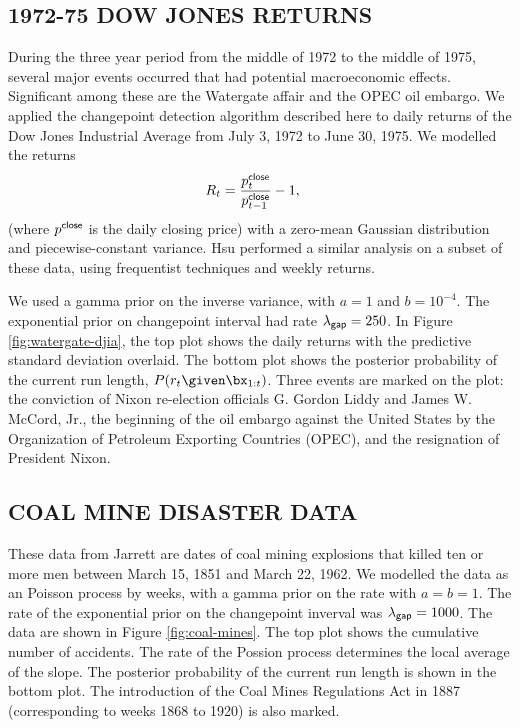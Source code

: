 \documentclass[]{article}
\begin{document}
    \subsection{1972-75 DOW JONES RETURNS}
      During the three year period from the middle of 1972 to the middle of
      1975, several major events occurred that had potential macroeconomic
      effects.  Significant among these are the Watergate affair and the
      OPEC oil embargo.  We applied the changepoint detection algorithm
      described here to daily returns of the Dow Jones Industrial Average
      from July 3, 1972 to June 30, 1975.  We modelled the returns
      \begin{align}
	R_{t} &= \frac{p^{\sf{close}}_{t}}{p^{\sf{close}}_{t-1}}-1,
      \end{align}
      (where $p^{\sf{close}}$ is the daily closing price) with a zero-mean
      Gaussian distribution and piecewise-constant variance.  Hsu
      \cite{hsu-1977a} performed a similar analysis on a subset of these
      data, using frequentist techniques and weekly returns.

      We used a gamma prior on the inverse variance, with $a=1$ and
      $b=10^{-4}$.  The exponential prior on changepoint interval had rate
      $\lambda_{\sf{gap}}=250$.  In Figure \ref{fig:watergate-djia}, the
      top plot shows the daily returns with the predictive standard
      deviation overlaid.  The bottom plot shows the posterior probability
      of the current run length, $P(r_{t}\given \bx_{1:t})$.  Three events
      are marked on the plot: the conviction of Nixon re-election officials
      G. Gordon Liddy and James W. McCord, Jr., the beginning of the oil
      embargo against the United States by the Organization of Petroleum
      Exporting Countries (OPEC), and the resignation of President Nixon.

    \subsection{COAL MINE DISASTER DATA}
      These data from Jarrett \cite{jarrett-1979a} are dates of coal mining
      explosions that killed ten or more men between March 15, 1851 and
      March 22, 1962.  We modelled the data as an Poisson process by weeks,
      with a gamma prior on the rate with $a=b=1$.  The rate of the
      exponential prior on the changepoint inverval was
      $\lambda_{\sf{gap}}=1000$.  The data are shown in Figure
      \ref{fig:coal-mines}.  The top plot shows the cumulative number of
      accidents.  The rate of the Possion process determines the local
      average of the slope.  The posterior probability of the current run
      length is shown in the bottom plot.  The introduction of the Coal
      Mines Regulations Act in 1887 (corresponding to weeks 1868 to 1920)
      is also marked.
\end{document}
